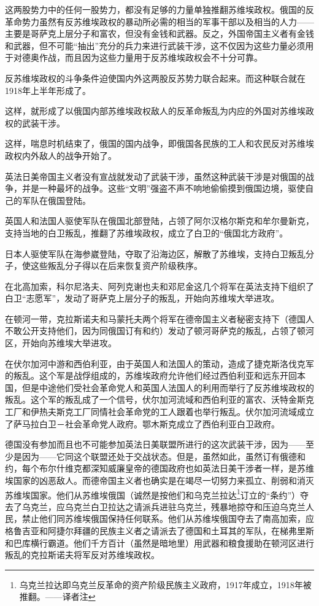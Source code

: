 这两股势力中的任何一股势力，都没有足够的力量单独推翻苏维埃政权。俄国的反革命势力虽然有反苏维埃政权的暴动所必需的相当的军事干部以及相当的人力——主要是哥萨克上层分子和富农，但没有金钱和武器。反之，外国帝国主义者有金钱和武器，但不可能“抽出”充分的兵力来进行武装干涉，这不仅因为这些力量必须用于对德奥作战，而且因为这些力量用于反苏维埃政权会不十分可靠。

反苏维埃政权的斗争条件迫使国内外这两股反苏势力联合起来。而这种联合就在1918年上半年形成了。

这样，就形成了以俄国内部苏维埃政权敌人的反革命叛乱为内应的外国对苏维埃政权的武装干涉。

这样，喘息时机结束了，俄国的国内战争，即俄国各民族的工人和农民反对苏维埃政权内外敌人的战争开始了。

英法日美帝国主义者没有宣战就发动了武装干涉，虽然这种武装干涉是对俄国的战争，并是一种最坏的战争。这些“文明”强盗不声不响地偷偷摸到俄国边境，驱使自己的军队在俄国登陆。

英国人和法国人驱使军队在俄国北部登陆，占领了阿尔汉格尔斯克和牟尔曼新克，支持当地的白卫叛乱，推翻了苏维埃政权，成立了白卫的“俄国北方政府”。

日本人驱使军队在海参崴登陆，夺取了沿海边区，解散了苏维埃，支持白卫叛乱分子，使这些叛乱分子得以在后来恢复资产阶级秩序。

在北高加索，科尔尼洛夫、阿列克谢也夫和邓尼金这几个将军在英法支持下组织了白卫“志愿军”，发动了哥萨克上层分子的叛乱，开始向苏维埃大举进攻。

在顿河一带，克拉斯诺夫和马蒙托夫两个将军在德帝国主义者秘密支持下（德国人不敢公开支持他们，因为同俄国订有和约）发动了顿河哥萨克的叛乱，占领了顿河区，开始向苏维埃大举进攻。

在伏尔加河中游和西伯利亚，由于英国人和法国人的策动，造成了捷克斯洛伐克军的叛乱。这个军是战俘组成的，苏维埃政府允许他们经过西伯利亚和远东开回本国，但是中途他们受社会革命党人和英国人法国人的利用而举行了反苏维埃政权的叛乱。这个军的叛乱成了一个信号，伏尔加河流域和西伯利亚的富农、沃特金斯克工厂和伊热夫斯克工厂同情社会革命党的工人跟着也举行叛乱。伏尔加河流域成立了萨马拉白卫－社会革命党人政府。鄂木斯克成立了西伯利亚白卫政府。

德国没有参加而且也不可能参加英法日美联盟所进行的这次武装干涉，因为——至少是因为——它同这个联盟还处于交战状态。但是，虽然如此，虽然订有俄德和约，每个布尔什维克都深知威廉皇帝的德国政府也如英法日美干涉者一样，是苏维埃国家的凶恶敌人。而德帝国主义者也确实是在竭尽一切努力来孤立、削弱和消灭苏维埃国家。他们从苏维埃俄国（诚然是按他们和乌克兰拉达\footnote{乌克兰拉达即乌克兰反革命的资产阶级民族主义政府，1917年成立，1918年被推翻。——译者注}订立的“条约”）夺去了乌克兰，应乌克兰白卫拉达之请派兵进驻乌克兰，残暴地掠夺和压迫乌克兰人民，禁止他们同苏维埃俄国保持任何联系。他们从苏维埃俄国夺去了南高加索，应格鲁吉亚和阿捷尔拜疆的民族主义者之请派去了德国和土耳其的军队，在梯弗里斯和巴库横行霸道。他们千方百计（虽然是暗地里）用武器和粮食援助在顿河区进行叛乱的克拉斯诺夫将军反对苏维埃政权。

